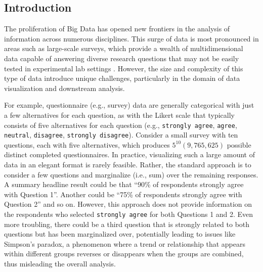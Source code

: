

\subsection{Introduction \label{introduction}}

The proliferation of Big Data has opened new frontiers in the analysis of information across numerous disciplines. This surge of data is most pronounced in areas such as large-scale surveys, which provide a wealth of multidimensional data capable of answering diverse research questions that may not be easily tested in experimental lab settings \cite{Manyika2011BigDT}. However, the size and complexity of this type of data introduce unique challenges, particularly in the domain of data visualization and downstream analysis.

For example, questionnaire (e.g., survey) data are generally categorical with just a few alternatives for each question, as with the Likert scale that typically consists of five alternatives for each question (e.g., \texttt{strongly agree}, \texttt{agree}, \texttt{neutral}, \texttt{disagree}, \texttt{strongly disagree}). Consider a small survey with ten questions, each with five alternatives, which produces $5^{10} (9,765,625)$ possible distinct completed questionnaires. In practice, visualizing such a large amount of data in an elegant format is rarely feasible. Rather, the standard approach is to consider a few questions and marginalize (i.e., sum) over the remaining responses. A summary headline result could be that ``90\% of respondents strongly agree with Question 1''. Another could be ``75\% of respondents strongly agree with Question 2'' and so on. However, this approach does not provide information on the respondents who selected \texttt{strongly agree} for both Questions 1 and 2. Even more troubling, there could be a third question that is strongly related to both questions but has been marginalized over, potentially leading to issues like Simpson's paradox\cite{hernan2011simpsons}, a phenomenon where a trend or relationship that appears within different groups reverses or disappears when the groups are combined, thus misleading the overall analysis.


